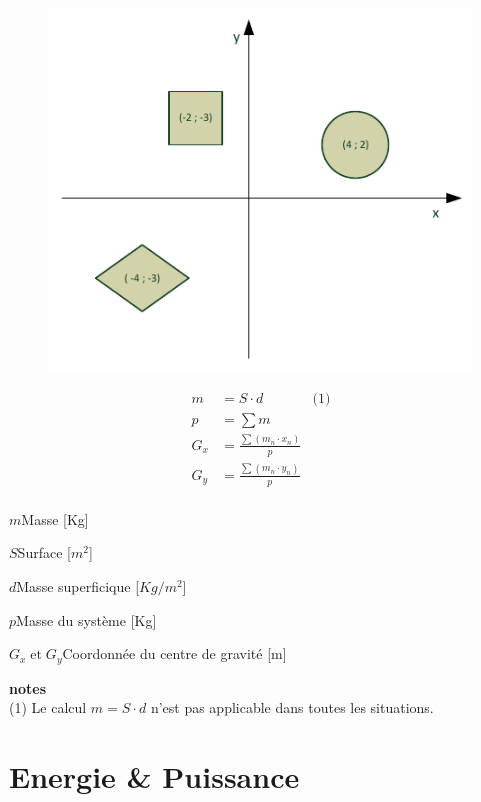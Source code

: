 \documentclass[12pt,a4paper]{article} %
\newcommand\framenote[1]{
	{\small {\bfseries notes} \\ #1}
}
\begin{document}
\begin{figure}[h]
	\centering
	\includegraphics{Statique-CentreGravite}
\end{figure}

\begin{twocols}[0.4][0.6]
	\begin{align*}
		m &= S \cdot d & \text{(1)} \\[1em]
		p &= \sum m \\[1em]
		G_x &= \frac{\sum\left(m_n \cdot x_n\right)}{p} \\[1em]
		G_y &= \frac{\sum\left(m_n \cdot y_n\right)}{p} \\
	\end{align*}
\nextcol
	\begin{vardef}
		\item{$m$}{Masse [Kg]}
		\item{$S$}{Surface [$m^2$]}
		\item{$d$}{Masse superficique [$Kg/m^2$]}
		\item{$p$}{Masse du système [Kg]}
		\item{$G_x\;\text{et}\;G_y$}{Coordonnée du centre de gravité [m]}
	\end{vardef}
	\par\vspace{0.5em}
	\framenote{(1) Le calcul $m = S \cdot d$ n'est pas applicable dans toutes les situations.}
\end{twocols}

\newpage

\section{Energie \& Puissance}
\end{document}

